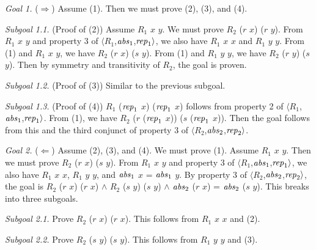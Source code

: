 \documentclass[envcountsame,runningheads]{llncs}
\begin{document}
{\it Goal 1.}
($\Rightarrow$)
Assume (1).  Then we must prove (2), (3), and (4).

{\it Subgoal 1.1.} (Proof of (2))
Assume $R_1$ $x$ $y$.  We must prove $R_2$ ($r$ $x$) ($r$ $y$).
From $R_1$ $x$ $y$ and property 3 of
$\langle R_1$,${\it abs}_1$,${\it rep}_1 \rangle$,
we also have 
$R_1$ $x$ $x$ and
$R_1$ $y$ $y$.
From (1) and $R_1$ $x$ $y$, we have $R_2$ ($r$ $x$) ($s$ $y$).
From (1) and $R_1$ $y$ $y$, we have $R_2$ ($r$ $y$) ($s$ $y$).
Then by symmetry and transitivity of $R_2$, the goal is proven.

{\it Subgoal 1.2.} (Proof of (3)) Similar to the previous subgoal.

{\it Subgoal 1.3.} (Proof of (4))
$R_1$ (${\it rep}_1$ $x$) (${\it rep}_1$ $x$) follows from
property 2 of 
$\langle R_1$,${\it abs}_1$,${\it rep}_1 \rangle$.
From (1),
we have
$R_2$ ($r$ (${\it rep}_1$ $x$)) ($s$ (${\it rep}_1$ $x$)).
Then the goal follows from this and the third conjunct of property 3 of 
$\langle R_2$,${\it abs}_2$,${\it rep}_2 \rangle$.

{\it Goal 2.} ($\Leftarrow$)
Assume (2), (3), and (4).  We must prove (1).
Assume $R_1$ $x$ $y$.  Then we must prove $R_2$ ($r$ $x$) ($s$ $y$).
From $R_1$ $x$ $y$ and property 3 of 
$\langle R_1$,${\it abs}_1$,${\it rep}_1 \rangle$,
we also have 
$R_1$ $x$ $x$,
$R_1$ $y$ $y$, and
${\it abs}_1$ $x$ = ${\it abs}_1$ $y$.
By property 3 of 
$\langle R_2$,${\it abs}_2$,${\it rep}_2 \rangle$,
the goal is
$R_2$ ($r$ $x$) ($r$ $x$) $\wedge$
$R_2$ ($s$ $y$) ($s$ $y$) $\wedge$
${\it abs}_2$ ($r$ $x$) = ${\it abs}_2$ ($s$ $y$).
This breaks into three subgoals.

{\it Subgoal 2.1.} Prove $R_2$ ($r$ $x$) ($r$ $x$).
This follows from
$R_1$ $x$ $x$ and (2).

{\it Subgoal 2.2.} Prove $R_2$ ($s$ $y$) ($s$ $y$).
This follows from
$R_1$ $y$ $y$ and (3).
\end{document}
